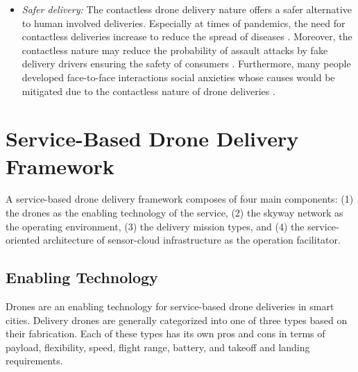 \documentclass[conference]{IEEEtran}
\begin{document}
\begin{itemize}[leftmargin=*]
\begin{itemize}
        \item\textit{Safer delivery:} The contactless drone delivery nature offers a safer alternative to human involved deliveries. Especially at times of pandemics, the need for contactless deliveries increase to reduce the spread of diseases \cite{alkouz2021provider}. Moreover, the contactless nature may reduce the probability of assault attacks by fake delivery drivers ensuring the safety of consumers \cite{bbc_news_2021}. Furthermore, many people developed face-to-face interactions social anxieties whose causes would be mitigated due to the contactless nature of drone deliveries \cite{jefferies2020social}. 
      
    \end{itemize}
\end{itemize}







\section{Service-Based Drone Delivery Framework}
A service-based drone delivery framework composes of four main components: (1) the drones as the enabling technology of the service, (2) the skyway network as the operating environment, (3) the delivery mission types, and (4) the service-oriented architecture of sensor-cloud infrastructure as the operation facilitator.

\subsection{Enabling Technology}
Drones are an enabling technology for service-based drone deliveries in smart cities. Delivery drones are generally categorized into one of three types based on their fabrication. Each of these types has its own pros and cons in terms of payload, flexibility, speed, flight range, battery, and takeoff and landing requirements.
\end{document}
